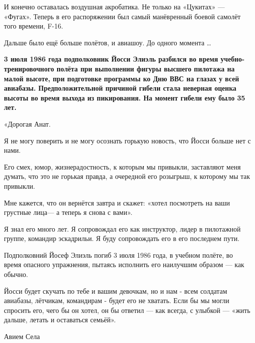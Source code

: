 И конечно оставалась воздушная акробатика. Не только на «Цукитах» — «Фугах». Теперь в его распоряжении был самый манёвренный боевой самолёт того времени, F-16.

Дальше было ещё больше полётов, и авиашоу. До одного момента …

\textbf{3 июля 1986 года подполковник Йосси Элиэль разбился во время учебно-тренировочного полёта при выполнении фигуры высшего пилотажа на малой высоте, при подготовке программы ко Дню ВВС на глазах у всей авиабазы. Предположительной причиной гибели стала неверная оценка высоты во время выхода из пикирования. На момент гибели ему было 35 лет.}

\begin{textcitation}
	«Дорогая Анат.
	
	Я не могу поверить и не могу осознать горькую новость, что Йосси больше нет с нами.
	
	Его смех, юмор, жизнерадостность, к которым мы привыкли, заставляют меня думать, что это не горькая правда, а очередной его розыгрыш, к которому мы так привыкли.
	
	Мне кажется, что он вернётся завтра и скажет: «хотел посмотреть на ваши грустные лица— а теперь я снова с вами».
	
	Я знал его много лет. Я сопровождал его как инструктор, лидер в пилотажной группе, командир эскадрильи. Я буду сопровождать его в его последнем пути.
	
	Подполковний Йосеф Элиэль погиб 3 июля 1986 года, в учебном полёте, во время опасного упражнения, пытаясь исполнить его наилучшим образом — как обычно. 
	
	Йосси будет скучать по тебе и вашим девочкам, но и нам - всем солдатам авиабазы, лётчикам, командирам - будет его не хватать. Если бы мы могли спросить его, чего бы он хотел, он бы ответил — как всегда, с улыбкой — «жить дальше, летать и оставаться семьёй».
	
	Авием Села
\end{textcitation}

